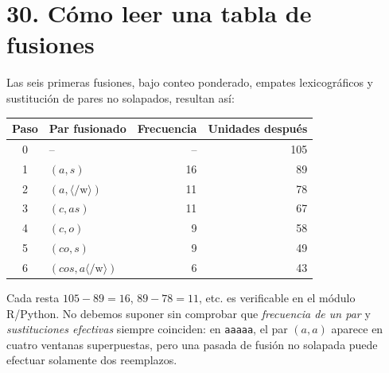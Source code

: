 \section*{30. Cómo leer una tabla de fusiones}
Las seis primeras fusiones, bajo conteo ponderado, empates lexicográficos y sustitución de pares no solapados, resultan así:
\begin{center}
\begin{tabular}{c l r r}\toprule
Paso & Par fusionado & Frecuencia & Unidades después\\\midrule
0 & -- & -- &105\\
1 & $(a,s)$ &16&89\\
2 & $(a,\langle/\mathrm{w}\rangle)$ &11&78\\
3 & $(c,as)$ &11&67\\
4 & $(c,o)$ &9&58\\
5 & $(co,s)$ &9&49\\
6 & $(cos,a\langle/\mathrm{w}\rangle)$ &6&43\\\bottomrule
\end{tabular}
\end{center}
\noindent Cada resta $105-89=16$, $89-78=11$, etc. es verificable en el módulo R/Python. No debemos suponer sin comprobar que \emph{frecuencia de un par} y \emph{sustituciones efectivas} siempre coinciden: en \texttt{aaaaa}, el par $(a,a)$ aparece en cuatro ventanas superpuestas, pero una pasada de fusión no solapada puede efectuar solamente dos reemplazos.

